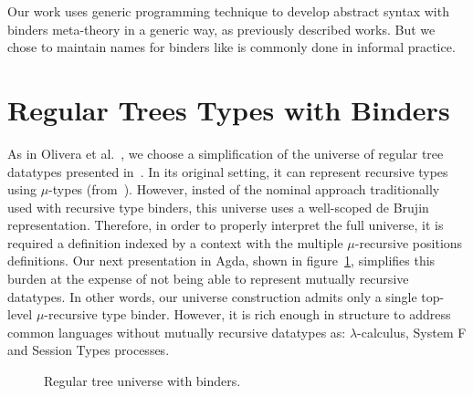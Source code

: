 \documentclass{book}
\begin{document}
Our work uses generic programming technique to develop abstract syntax with binders meta-theory in a generic way, as previously described works. But we chose to maintain names for binders like is commonly done in informal practice.



\section{Regular Trees Types with Binders}

As in Olivera et al.~\cite{Lee2012}, we choose a simplification of the universe of regular tree datatypes presented in~\cite{Morris:2004}. In its original setting, it can represent recursive types using $\mu$-types (from~\cite{Pierce:2002}). However, insted of the nominal approach traditionally used with recursive type binders, this universe uses a well-scoped de Brujin representation. Therefore,  in order to properly interpret the full universe, it is required a definition indexed by a context with the multiple $\mu$-recursive positions definitions. Our next presentation in Agda, shown in figure~\ref{fig:regulartree}, simplifies this burden at the expense of not being able to represent mutually recursive datatypes. In other words, our universe construction admits only a single top-level $\mu$-recursive type binder. However, it is rich enough in structure to address common languages without mutually recursive datatypes as: $\lambda$-calculus, System F and Session Types processes.

\begin{figure}[h]


  \caption{Regular tree universe with binders.}
\label{fig:regulartree}
\end{figure}
\end{document}
